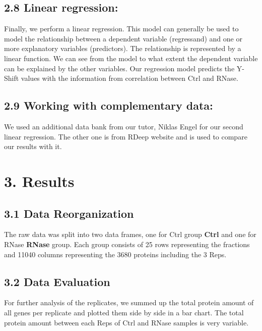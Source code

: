 \documentclass[
]{article}
\begin{document}
\hypertarget{linear-regression}{%
\subsection{2.8 Linear regression:}\label{linear-regression}}

Finally, we perform a linear regression. This model can generally be
used to model the relationship between a dependent variable (regressand)
and one or more explanatory variables (predictors). The relationship is
represented by a linear function. We can see from the model to what
extent the dependent variable can be explained by the other variables.
Our regression model predicts the Y-Shift values with the information
from correlation between Ctrl and RNase.

\hypertarget{working-with-complementary-data}{%
\subsection{2.9 Working with complementary
data:}\label{working-with-complementary-data}}

We used an additional data bank from our tutor, Niklas Engel for our
second linear regression. The other one is from RDeep website and is
used to compare our results with it.

\hypertarget{results}{%
\section{3. Results}\label{results}}

\hypertarget{data-reorganization}{%
\subsection{3.1 Data Reorganization}\label{data-reorganization}}

The raw data was split into two data frames, one for Ctrl group
\textbf{Ctrl} and one for RNase \textbf{RNase} group. Each group
consists of 25 rows representing the fractions and 11040 columns
representing the 3680 proteins including the 3 Reps.

\hypertarget{data-evaluation}{%
\subsection{3.2 Data Evaluation}\label{data-evaluation}}

For further analysis of the replicates, we summed up the total protein
amount of all genes per replicate and plotted them side by side in a bar
chart. The total protein amount between each Reps of Ctrl and RNase
samples is very variable.
\end{document}
